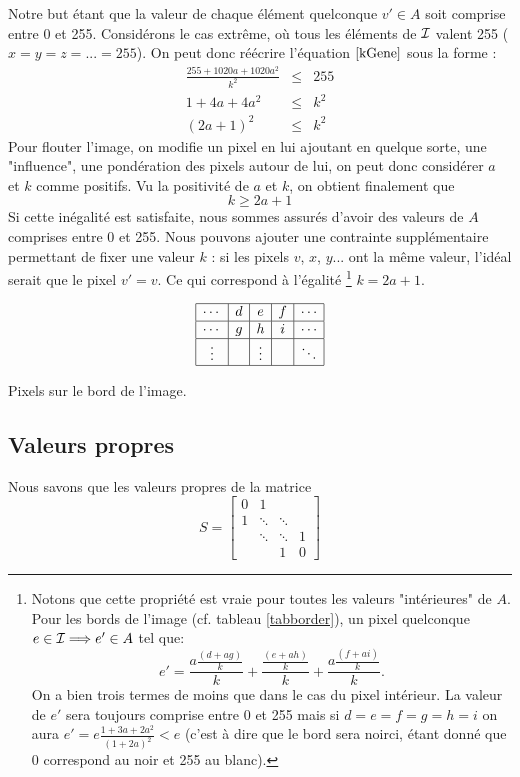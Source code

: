 Notre but étant que la valeur de chaque élément quelconque $v' \in A$	soit comprise entre 0 et 255. 
Considérons le cas extrême, où tous les éléments de $\mathcal{I}$ valent 255 ($x=y=z=...=255$).
On peut donc réécrire l'équation $\ref{kGene}$ sous la forme :
\begin{eqnarray}
\frac{255+1020a+1020a^2}{k^2} &\leq & 255 \\
1+4a+4a^2 &\leq & k^2 \\
(2a+1)^2 &\leq & k^2
\end{eqnarray}
Pour flouter l'image, on modifie un pixel en lui ajoutant en quelque sorte, une "influence", une pondération des pixels autour de lui, on peut donc considérer $a$ et $k$ comme positifs.  
Vu la positivité de $a$ et $k$, on obtient finalement que
\begin{equation}
k \geq 2a+1
\end{equation}
Si cette inégalité est satisfaite, nous sommes assurés d'avoir des valeurs de $A$ comprises entre 0 et 255. Nous  pouvons ajouter une contrainte supplémentaire permettant de fixer une valeur $k$ : si les pixels $v$, $x$, $y$... ont la même valeur, l'idéal serait que le pixel $v'=v$. Ce qui correspond à l'égalité \footnote{Notons que cette propriété est vraie pour toutes les valeurs "intérieures" de $A$. Pour les bords de l'image (cf. tableau \ref{tabborder}), un pixel quelconque $e \in \mathcal{I} \Longrightarrow e' \in A$ tel que:  
$$e' = \frac{a \frac{(d+ag)}{k}}{k} + \frac{ \frac{(e+ah)}{k}}{k} + \frac{a \frac{(f+ai)}{k}}{k} . $$ On a bien trois termes de moins que dans le cas du pixel intérieur. La valeur de $e'$ sera toujours comprise entre 0 et 255 mais si $d=e=f=g=h=i$ on aura $e'= e \frac{1+3a+2a^2}{(1+2a)^2} < e$ (c'est à dire que le bord sera noirci, étant donné que 0 correspond au noir et 255 au blanc).}  $k=2a+1$. 

\begin{table}
$$
\begin{array}{|c|c|c|c|c|} 
\hline
\cdots & d & e & f & \cdots\\
\hline
\cdots & g & h & i & \cdots\\
\hline
\vdots &  & \vdots &  & \ddots \\
\hline
\end{array} 
$$
\caption{Pixels sur le bord de l'image.}
\label{tabborder}
\end{table}

\subsection{Valeurs propres}
Nous savons que les valeurs propres de la matrice
$$
S =
 \begin{bmatrix}
    0 & 1 		& 			& \\
    1 & \ddots 	& \ddots 	& \\
      & \ddots 	& \ddots 	& 1 \\
      & 		& 1			& 0
  \end{bmatrix}
$$

